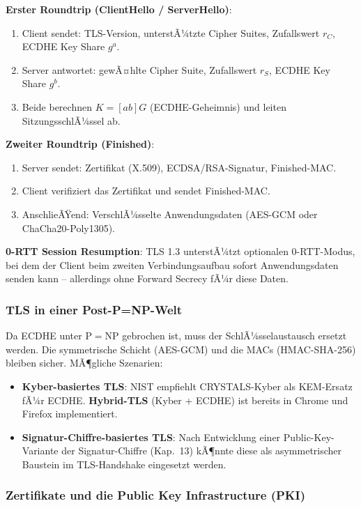 ﻿\documentclass[a4paper,12pt]{scrreprt}
\theoremstyle{definition}
\begin{document}
\textbf{Erster Roundtrip (ClientHello / ServerHello)}:
\begin{enumerate}
    \item Client sendet: TLS-Version, unterstÃ¼tzte Cipher Suites, Zufallswert $r_C$, ECDHE Key Share $g^a$.
    \item Server antwortet: gewÃ¤hlte Cipher Suite, Zufallswert $r_S$, ECDHE Key Share $g^b$.
    \item Beide berechnen $K = [ab]G$ (ECDHE-Geheimnis) und leiten SitzungsschlÃ¼ssel ab.
\end{enumerate}

\textbf{Zweiter Roundtrip (Finished)}:
\begin{enumerate}
    \item Server sendet: Zertifikat (X.509), ECDSA/RSA-Signatur, Finished-MAC.
    \item Client verifiziert das Zertifikat und sendet Finished-MAC.
    \item AnschlieÃŸend: VerschlÃ¼sselte Anwendungsdaten (AES-GCM oder ChaCha20-Poly1305).
\end{enumerate}

\textbf{0-RTT Session Resumption}: TLS 1.3 unterstÃ¼tzt optionalen 0-RTT-Modus, bei dem der Client beim zweiten Verbindungsaufbau sofort Anwendungsdaten senden kann -- allerdings ohne Forward Secrecy fÃ¼r diese Daten.

\subsubsection{TLS in einer Post-P=NP-Welt}

Da ECDHE unter $\mathrm{P}=\mathrm{NP}$ \cite{Epp26a} gebrochen ist, muss der SchlÃ¼sselaustausch ersetzt werden. Die symmetrische Schicht (AES-GCM) und die MACs (HMAC-SHA-256) bleiben sicher. MÃ¶gliche Szenarien:

\begin{itemize}
    \item \textbf{Kyber-basiertes TLS}: NIST empfiehlt CRYSTALS-Kyber \cite{ABD+22} als KEM-Ersatz fÃ¼r ECDHE. \textbf{Hybrid-TLS} (Kyber + ECDHE) ist bereits in Chrome und Firefox implementiert.
    \item \textbf{Signatur-Chiffre-basiertes TLS}: Nach Entwicklung einer Public-Key-Variante der Signatur-Chiffre (Kap.~13) kÃ¶nnte diese als asymmetrischer Baustein im TLS-Handshake eingesetzt werden.
\end{itemize}

\subsubsection{Zertifikate und die Public Key Infrastructure (PKI)}
\end{document}
